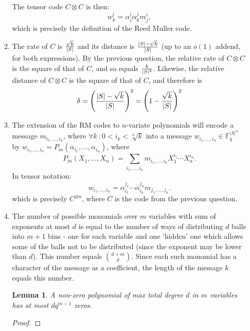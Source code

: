 \documentclass[11pt]{article} \usepackage{amssymb}
\newtheorem*{lemma*}{Lemma}
\begin{document}
\begin{enumerate}
\begin{enumerate}
The tensor code $C\otimes C$ is then:
\begin{equation*}
  w_k^l=\alpha_i^l\alpha_k^jm_j^i,
\end{equation*}
which is precisely the definition of the Reed Muller code.
\item
The rate of $C$ is ${\sqrt{k}\over |S|}$  and its distance is 
${|S|-\sqrt{k} \over |S|}$ (up to an $o(1)$ addend, for both expressions). By the previous question,
the relative rate of $C\otimes C$ is the square of that of $C$, and so equals
${k\over |S|^2}$. Likewise, the relative distance of $C\otimes C$ is the square
of that of $C$, and therefore is
\begin{equation*}
  \delta=\left({|S|-\sqrt{k} \over |S|}\right)^2
        =\left(1-{\sqrt{k} \over |S|}\right)^2
\end{equation*}
\item
The extension of the RM codes to $n$-variate polynomials will encode
a message $m_{i_1,\ldots,i_n}$, where $\forall k\:: 0<i_k<\sqrt[n]{k}$ into a message
 $w_{i_1,\ldots,i_n}\in \mathbb{F}_q^{|S|^n}$ by $w_{i_1,\ldots,i_n}=P_m(\alpha_{i_1},\ldots,\alpha_{i_n})$, where
 \begin{equation*}
P_m(X_1,\ldots,X_n)=\sum_{i_1,\ldots,i_n}m_{i_1,\ldots,i_n}X_1^{i_1}\cdots X_n^{i_n}.
 \end{equation*}
In tensor notation:
\begin{equation*}
  w_{i_1,\ldots,i_n}=\alpha_{i_1}^{j_1}\cdots\alpha_{i_n}^{j_n}m_{j_1,\ldots,j_n}.  
\end{equation*}
which is precisely $C^{\otimes n}$, where $C$ is the code from the
previous question.
\item
The number of possible monomials over $m$ variables with sum of exponents  at
most $d$ is equal to the number of ways of distributing $d$ balls 
into $m + 1$ bins - one for each variable and one 'hidden' one which 
allows some of the balls not to be distributed (since the exponent may be
lower than $d$). This number equals ${d+m\choose d}$. Since each such monomial has
a character of the message as a coefficient, the length of the message
$k$ equals this number.

\begin{lemma*}

A non-zero polynomial of
max total degree $d$ in $m$ variables has at most $dq^{m-1}$ zeros.
\end{lemma*}
\begin{proof}



\end{proof}
\end{enumerate}
\end{enumerate}
\end{document}
